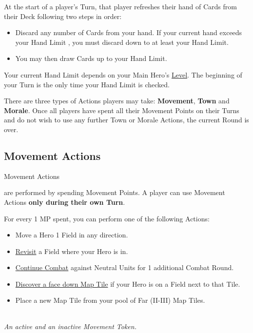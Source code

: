 
\begin{multicols}{2}

At the start of a player's Turn, that player refreshes their hand of Cards from their Deck following two steps in order:
\begin{itemize}
  \item Discard any number of Cards from your hand.
If your current hand exceeds your Hand Limit , you must discard down to at least your Hand Limit.
  \item You may then draw Cards up to your Hand Limit.
\end{itemize}
Your current Hand Limit depends on your Main Hero's \hyperlink{Level}{Level}.
The beginning of your Turn is the only time your Hand Limit is checked.\par
There are three types of Actions players may take: \textbf{Movement}, \textbf{Town} and \textbf{Morale}.
Once all players have spent all their Movement Points on their Turns and do not wish to use any further Town or Morale Actions, the current Round is over.
\subsection*{Movement Actions}
\hypertarget{Movement}{Movement Actions} are performed by spending Movement Points.
A player can use Movement Actions \textbf{only during their own Turn}.\par
For every 1 MP spent, you can perform one of the following Actions:
\begin{itemize}
  \item Move a Hero 1 Field in any direction.
  \item \hyperlink{Categories}{Revisit} a Field where your Hero is in.
  \item \hyperlink{Timelimit}{Continue Combat} against Neutral Units for 1 additional Combat Round.
  \item \hyperlink{Placing}{Discover a face down Map Tile} if your Hero is on a Field next to that Tile.
  \item Place a new Map Tile from your pool of Far (II-III) Map Tiles.
\end{itemize}

\begin{center}
  \\
  \medskip
  \footnotesize\textit{An active and an inactive Movement Token.}
\end{center}


\end{multicols}
